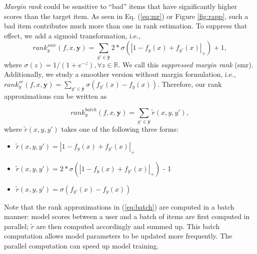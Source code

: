 \documentclass[letterpaper]{article} %
\begin{document}


\textit{Margin rank} could be sensitive to ``bad'' items that have significantly higher scores than the target item. As seen in Eq. (\ref{eq:mr}) or Figure \ref{fig:rapp}, such a bad item contributes much more than one in rank estimation. To suppress that effect, we add a sigmoid transformation, i.e.,
\begin{equation}
\label{eq:smr}
rank^{smr}_y(f,x,\textbf{y}) =\sum_{y'\in \bar{\textbf{y}} } 2 * \sigma(|1-f_y(x) + f_{y'}(x)|_+) + 1, %
\end{equation}
where $\sigma(z) = 1 / (1 + e^{-z}), \forall z\in \mathbb{R}$. We call this \textit{suppressed margin rank} (smr). Additionally, we study a smoother version without margin formulation, i.e., $rank^{sr}_y(f,x,\textbf{y}) =\sum_{y'\in \bar{\textbf{y}} } \sigma( f_{y'}(x) - f_{y}(x))$. Therefore, our rank approximations can be written as

\begin{equation}
\label{eq:batch}
rank^{batch}_y(f,x,\textbf{y}) =\sum_{y'\in \bar{\textbf{y}} } \tilde{r}(x,y,y'),
\end{equation}
where $\tilde{r}(x, y, y')$ takes one of the following three forms:
\begin{itemize}
\item $\tilde{r}(x, y, y') = | 1 - f_y(x) + f_{y'}(x)|_+$
\item $\tilde{r}(x, y, y') = 2 * \sigma(| 1 - f_y(x) + f_{y'}(x)|_+)$  - 1
\item $\tilde{r}(x, y, y') = \sigma(f_{y'}(x) - f_y(x))$
\end{itemize}

Note that the rank approximations in (\ref{eq:batch}) are computed in a batch manner: model scores between a user and a batch of items are first computed in parallel; $\tilde{r}$ are then computed accordingly and summed up. This batch computation allows model parameters to be updated more frequently. The parallel computation can speed up model training. %
\end{document}
